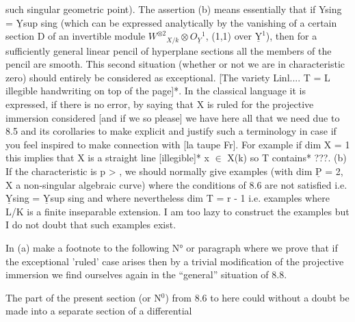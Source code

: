
such singular geometric point).  The assertion (b) means
essentially that if Ysing = $\underline{\text{Y}}$sup sing (which can be expressed
analytically by the vanishing of a certain section D of an
invertible module $W^{\otimes 2}{}_{X/k} \otimes O_{\underline{Y}}{}^{1}$, (1,1) over $\underline{\text{Y}}^{1}$), then for a
sufficiently general linear pencil of hyperplane sections all the
members of the pencil are smooth.  This second situation (whether
or not we are in characteristic zero) should entirely be
considered as exceptional.  [The variety Linl.... T = L illegible
handwriting on top of the page]*.  In the classical language it is
expressed, if there is no error, by saying that X is ruled for the
projective immersion considered [and if we so please] we have here
all that we need due to 8.5 and its corollaries to make explicit
and justify such a terminology in case if you feel inspired to
make connection with [la taupe Fr].  For example if dim X = 1 this
implies that X is a straight line [illegible]* x $\in$ X(k) so T
contains* ???.  (b) If the characteristic is p > , we should
normally give examples (with dim $\underline{\text{P}}$ = 2, X a non-singular algebraic
curve) where the conditions of 8.6 are not satisfied i.e. $\underline{\text{Y}}$sing =
$\underline{\text{Y}}$sup sing and where nevertheless dim T = r - 1 i.e. examples where
L/K is a finite inseparable extension.  I am too lazy to construct
the examples but I do not doubt that such examples exist.

In (a) make a footnote to the following N° or paragraph where
we prove that if the exceptional 'ruled' case arises then by a
trivial modification of the projective immersion we find ourselves
again in the ``general'' situation of 8.8.

The part of the present section (or N$^{0}$) from 8.6 to here could
without a doubt be made into a separate section of a differential

